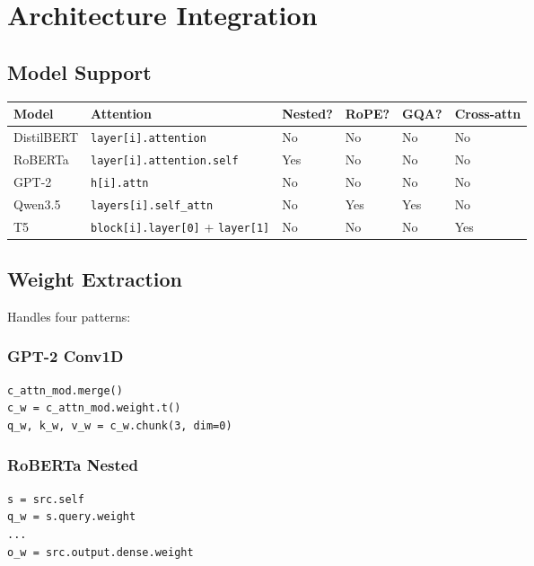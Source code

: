 \section{Architecture Integration}

\subsection{Model Support}

\begin{table}[H]
\centering
\small
\begin{tabular}{llllll}
\toprule
\textbf{Model} & \textbf{Attention} & \textbf{Nested?} & \textbf{RoPE?} & \textbf{GQA?} & \textbf{Cross-attn} \\
\midrule
DistilBERT & \texttt{layer[i].attention} & No & No & No & No \\
RoBERTa & \texttt{layer[i].attention.self} & Yes & No & No & No \\
GPT-2 & \texttt{h[i].attn} & No & No & No & No \\
Qwen3.5 & \texttt{layers[i].self\_attn} & No & Yes & Yes & No \\
T5 & \texttt{block[i].layer[0]} + \texttt{layer[1]} & No & No & No & Yes \\
\bottomrule
\end{tabular}
\end{table}

\subsection{Weight Extraction}

Handles four patterns:

\subsubsection{GPT-2 Conv1D}

\begin{lstlisting}
c_attn_mod.merge()
c_w = c_attn_mod.weight.t()
q_w, k_w, v_w = c_w.chunk(3, dim=0)
\end{lstlisting}

\subsubsection{RoBERTa Nested}

\begin{lstlisting}
s = src.self
q_w = s.query.weight
...
o_w = src.output.dense.weight
\end{lstlisting}

